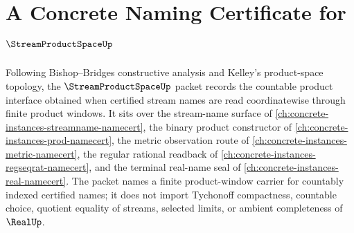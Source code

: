 \chapter{A Concrete Naming Certificate for $\StreamProductSpaceUp$}
\label{ch:concrete-instances-stream-product-space-namecert}

Following Bishop--Bridges constructive analysis and Kelley's product-space topology, the $\StreamProductSpaceUp$ packet records the countable product interface obtained when certified stream names are read coordinatewise through finite product windows. It sits over the stream-name surface of \autoref{ch:concrete-instances-streamname-namecert}, the binary product constructor of \autoref{ch:concrete-instances-prod-namecert}, the metric observation route of \autoref{ch:concrete-instances-metric-namecert}, the regular rational readback of \autoref{ch:concrete-instances-regseqrat-namecert}, and the terminal real-name seal of \autoref{ch:concrete-instances-real-namecert}. The packet names a finite product-window carrier for countably indexed certified names; it does not import Tychonoff compactness, countable choice, quotient equality of streams, selected limits, or ambient completeness of $\RealUp$.

